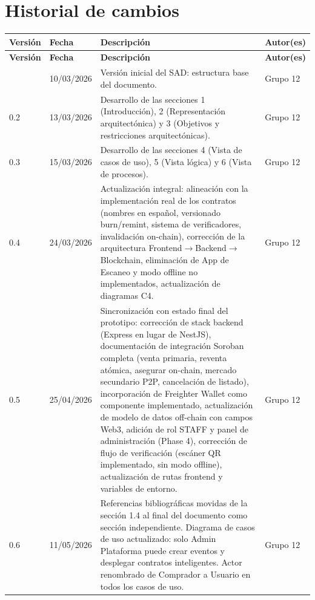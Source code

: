 \documentclass[12pt,oneside]{article}
\newcommand{\team}{Grupo 12}
\begin{document}
\section*{Historial de cambios}
\begin{longtable}{@{}p{2cm} p{3cm} p{7.5cm} p{2.5cm}@{}}
  \toprule
  \textbf{Versión} & \textbf{Fecha} & \textbf{Descripción} & \textbf{Autor(es)}\\
  \midrule
  \endfirsthead
  \toprule
  \textbf{Versión} & \textbf{Fecha} & \textbf{Descripción} & \textbf{Autor(es)}\\
  \midrule
  \endhead
  \bottomrule
  \endfoot
  0.1 & 10/03/2026 & Versión inicial del SAD: estructura base del documento. & \team\\
  0.2 & 13/03/2026 & Desarrollo de las secciones 1 (Introducción), 2 (Representación arquitectónica) y 3 (Objetivos y restricciones arquitectónicas). & \team\\
  0.3 & 15/03/2026 & Desarrollo de las secciones 4 (Vista de casos de uso), 5 (Vista lógica) y 6 (Vista de procesos). & \team\\
  0.4 & 24/03/2026 & Actualización integral: alineación con la implementación real de los contratos (nombres en español, versionado burn/remint, sistema de verificadores, invalidación on-chain), corrección de la arquitectura Frontend$\rightarrow$Backend$\rightarrow$Blockchain, eliminación de App de Escaneo y modo offline no implementados, actualización de diagramas C4. & \team\\
  0.5 & 25/04/2026 & Sincronización con estado final del prototipo: corrección de stack backend (Express en lugar de NestJS), documentación de integración Soroban completa (venta primaria, reventa atómica, asegurar on-chain, mercado secundario P2P, cancelación de listado), incorporación de Freighter Wallet como componente implementado, actualización de modelo de datos off-chain con campos Web3, adición de rol STAFF y panel de administración (Phase 4), corrección de flujo de verificación (escáner QR implementado, sin modo offline), actualización de rutas frontend y variables de entorno. & \team\\
  0.6 & 11/05/2026 & Referencias bibliográficas movidas de la sección 1.4 al final del documento como sección independiente. Diagrama de casos de uso actualizado: solo Admin Plataforma puede crear eventos y desplegar contratos inteligentes. Actor renombrado de Comprador a Usuario en todos los casos de uso. & \team\\
\end{longtable}
\end{document}
